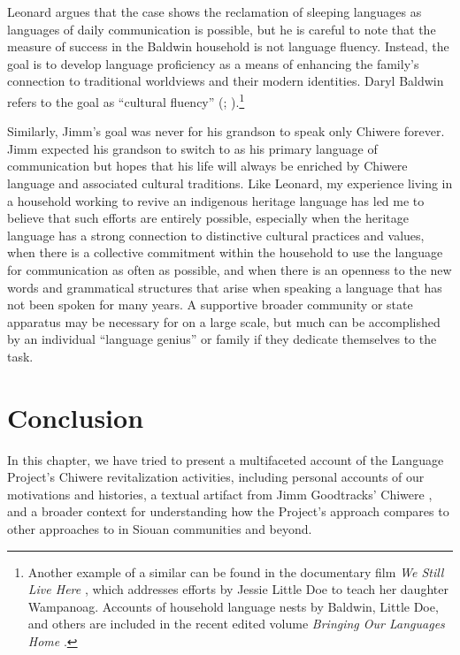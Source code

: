 \documentclass[output=paper]{LSP/langsci}
\begin{document}
Leonard argues that the  case shows the reclamation of sleeping languages as languages of daily communication is possible, but he is careful to note that the measure of success in the Baldwin household is not  language fluency. Instead, the goal is to develop language proficiency as a means of enhancing the family's connection to traditional worldviews and their modern  identities. Daryl Baldwin refers to the goal as ``cultural fluency'' (\citealt[36--37]{Leonard2007}; \citeyear[139--140]{Leonard2011}).\footnote{Another example of a similar  can be found in the documentary film \emph{We Still Live Here} \citep{Makepeace2011}, which addresses efforts by Jessie Little Doe to teach her daughter Wampanoag. Accounts of household language nests by Baldwin, Little Doe, and others are included in the recent edited volume \emph{Bringing Our Languages Home} \citep{Hinton2013}.} 

Similarly, Jimm's goal was never for his grandson to speak only Chiwere forever. Jimm expected his grandson to switch to  as his primary language of communication but hopes that his life will always be enriched by Chiwere language and associated cultural traditions. Like Leonard, my experience living in a household working to revive an indigenous heritage language has led me to believe that such efforts are entirely possible, especially when the heritage language has a strong connection to distinctive cultural practices and values, when there is a collective commitment within the household to use the language for communication as often as possible, and when there is an openness to the new words and grammatical structures that arise when speaking a language that has not been spoken for many years. A supportive broader community or state apparatus may be necessary for  on a large scale, but much can be accomplished by an individual ``language genius'' or family if they dedicate themselves to the task.

\section{Conclusion}
In this chapter, we have tried to present a multifaceted account of the  Language Project's Chiwere revitalization activities, including personal accounts of our motivations and histories, a textual artifact from Jimm Goodtracks' Chiwere , and a broader context for understanding how the Project's approach compares to other approaches to  in Siouan communities and beyond.
\end{document}
